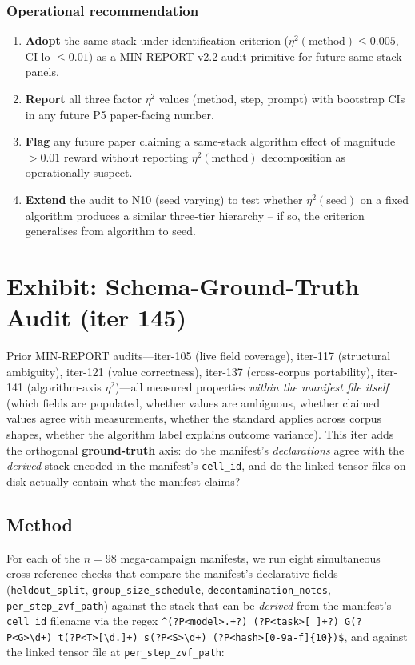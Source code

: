 \documentclass{article}  \usepackage[preprint,nonatbib]{neurips_2026} \usepackage[numbers]{natbib}
\begin{document}
\subsubsection{Operational recommendation}

\begin{enumerate}
\item \textbf{Adopt} the same-stack under-identification criterion
($\eta^2(\text{method}) \leq 0.005$, CI-lo $\leq 0.01$) as a MIN-REPORT
v2.2 audit primitive for future same-stack panels.
\item \textbf{Report} all three factor $\eta^2$ values (method, step,
prompt) with bootstrap CIs in any future P5 paper-facing number.
\item \textbf{Flag} any future paper claiming a same-stack algorithm effect
of magnitude $> 0.01$ reward without reporting $\eta^2(\text{method})$
decomposition as operationally suspect.
\item \textbf{Extend} the audit to N10 (seed varying) to test whether
$\eta^2(\text{seed})$ on a fixed algorithm produces a similar three-tier
hierarchy -- if so, the criterion generalises from algorithm to seed.
\end{enumerate} \section{Exhibit: Schema-Ground-Truth Audit (iter 145)}
\label{sec:p5-schema-groundtruth}

Prior MIN-REPORT audits---iter-105 (live field coverage), iter-117
(structural ambiguity), iter-121 (value correctness), iter-137 (cross-corpus
portability), iter-141 (algorithm-axis $\eta^2$)---all measured properties
\emph{within the manifest file itself} (which fields are populated, whether
values are ambiguous, whether claimed values agree with measurements, whether
the standard applies across corpus shapes, whether the algorithm label
explains outcome variance). This iter adds the orthogonal
\textbf{ground-truth} axis: do the manifest's \emph{declarations} agree with
the \emph{derived} stack encoded in the manifest's \texttt{cell\_id}, and do
the linked tensor files on disk actually contain what the manifest claims?

\subsection*{Method}

For each of the $n = 98$ mega-campaign manifests, we run eight simultaneous
cross-reference checks that compare the manifest's declarative fields
(\texttt{heldout\_split}, \texttt{group\_size\_schedule},
\texttt{decontamination\_notes}, \texttt{per\_step\_zvf\_path}) against the
stack that can be \emph{derived} from the manifest's \texttt{cell\_id}
filename via the regex
\texttt{\^{}(?P<model>.+?)\_(?P<task>[\_]+?)\_G(?P<G>\textbackslash d+)\_t(?P<T>[\textbackslash d.]+)\_s(?P<S>\textbackslash d+)\_(?P<hash>[0-9a-f]\{10\})\$},
and against the linked tensor file at \texttt{per\_step\_zvf\_path}:
\end{document}
